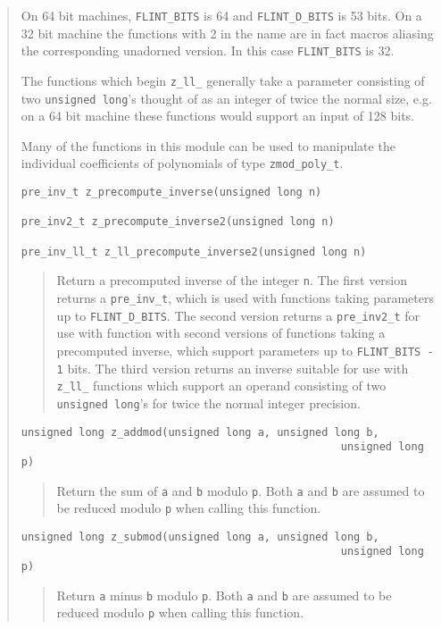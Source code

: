 \documentclass[a4paper,10pt]{article}
\newcommand{\code}{\lstinline}
\begin{document}
\begin{quote}
On 64 bit machines, \code{FLINT_BITS} is 64 and \code{FLINT_D_BITS} is 53 bits. On a 32 bit machine the functions with 2 in the name are in fact macros aliasing the corresponding unadorned version. In this case \code{FLINT_BITS} is 32.

The functions which begin \code{z_ll_} generally take a parameter consisting of two \code{unsigned long}'s thought of as an integer of twice the normal size, e.g. on a 64 bit machine these functions would support an input of 128 bits.

Many of the functions in this module can be used to manipulate the individual coefficients of polynomials of type \code{zmod_poly_t}.

\begin{lstlisting}
pre_inv_t z_precompute_inverse(unsigned long n)

pre_inv2_t z_precompute_inverse2(unsigned long n)

pre_inv_ll_t z_ll_precompute_inverse2(unsigned long n)
\end{lstlisting}
\begin{quote}
Return a precomputed inverse of the integer \code{n}. The first version returns a \code{pre_inv_t}, which is used with functions taking parameters up to \code{FLINT_D_BITS}. The second version returns a \code{pre_inv2_t} for use with function with second versions of functions taking a precomputed inverse, which support parameters up to \code{FLINT_BITS - 1} bits. The third version returns an inverse suitable for use with \code{z_ll_} functions which support an operand consisting of two \code{unsigned long}'s for twice the normal integer precision.
\end{quote}

\begin{lstlisting}
unsigned long z_addmod(unsigned long a, unsigned long b, 
                                                  unsigned long p)
\end{lstlisting}
\begin{quote}
Return the sum of \code{a} and \code{b} modulo \code{p}. Both \code{a} and \code{b} are assumed to be reduced modulo \code{p} when calling this function. 
\end{quote}

\begin{lstlisting}
unsigned long z_submod(unsigned long a, unsigned long b, 
                                                  unsigned long p)
\end{lstlisting}
\begin{quote}
Return \code{a} minus \code{b} modulo \code{p}. Both \code{a} and \code{b} are assumed to be reduced modulo \code{p} when calling this function. 
\end{quote}


\end{quote}
\end{document}
